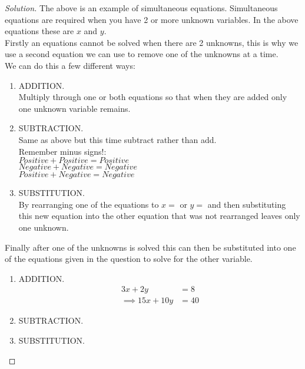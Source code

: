 \documentclass[12pt]{article}
\newenvironment{solution}{\begin{proof}[Solution]}{\end{proof}}
\begin{document}
 
\begin{solution} %
The above is an example of simultaneous equations. Simultaneous equations are required when you have 2 or more unknown variables. In the above equations these are $x$ and $y$. \\
Firstly an equations cannot be solved when there are 2 unknowns, this is why we use a second equation we can use to remove one of the unknowns at a time. \\
We can do this a few different ways:
\begin{enumerate}
    \item ADDITION. \\
        Multiply through one or both equations so that when they are added only one unknown variable remains. \\
    \item SUBTRACTION. \\
        Same as above but this time subtract rather than add. \\
        Remember minus signs!: \\
        $Positive + Positive = Positive$ \\
        $Negative + Negative = Negative$ \\
        $Positive + Negative = Negative$ \\       
    \item SUBSTITUTION. \\
        By rearranging one of the equations to $x =$ or $y =$ and then substituting this new equation into the other equation that was not rearranged leaves only one unknown. \\
\end{enumerate}

Finally after one of the  unknowns is solved this can then be substituted into one of the equations given in the question to solve for the other variable.
\clearpage

\begin{enumerate}
    \item ADDITION. \\
    \begin{align*}
        3x + 2y &= 8  \\
        \implies 15x + 10y &= 40
    \end{align*}
    \item SUBTRACTION. \\
     
    \item SUBSTITUTION. \\
 
\end{enumerate}

\end{solution}
 
\end{document}
